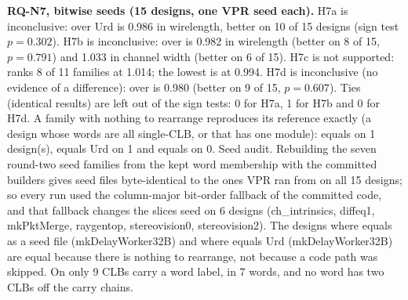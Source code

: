 \textbf{RQ-N7, bitwise seeds (15 designs, one VPR seed each).}
H7a is inconclusive:  over Urd is 0.986 in wirelength, better on 10 of
15 designs (sign test $p=0.302$).
H7b is inconclusive:  over  is 0.982 in wirelength
(better on 8 of 15, $p=0.791$) and 1.033 in channel width
(better on 6 of 15).
H7c is not supported:  ranks 8 of 11 families at
1.014; the lowest is  at 0.994.
H7d is inconclusive (no evidence of a difference):  over  is 0.980
(better on 9 of 15, $p=0.607$).
Ties (identical results) are left out of the sign tests: 0 for H7a, 1 for H7b and
0 for H7d. A family with nothing to rearrange reproduces its reference exactly (a design whose words are
all single-CLB, or that has one module):  equals  on 1
design(s),  equals Urd on 1 and  equals  on
0.
Seed audit. Rebuilding the seven round-two seed families from the kept word membership with the committed builders gives
seed files byte-identical to the ones VPR ran from on all 15 designs;
so every  run used the column-major bit-order fallback of the committed code, and that fallback changes the slices
seed on 6 designs (ch\_intrinsics, diffeq1, mkPktMerge, raygentop, stereovision0, stereovision2). The designs where  equals  as a seed file
(mkDelayWorker32B) and where  equals Urd (mkDelayWorker32B) are equal because there is nothing to rearrange, not because
a code path was skipped. On  only 9 CLBs carry a word label, in 7 words, and no word has two CLBs off the carry chains.

